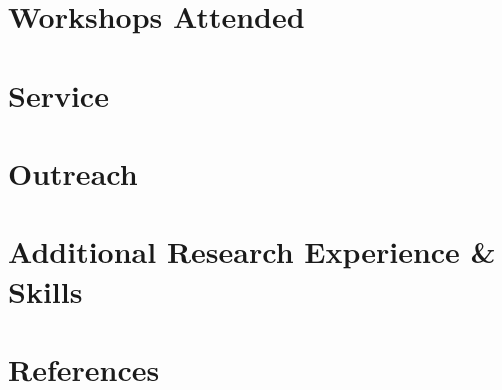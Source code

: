 \section*{Workshops Attended}


\section*{Service}


\section*{Outreach}


\section*{Additional Research Experience \& Skills}


\section*{References}



